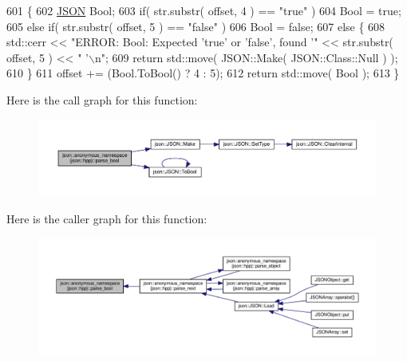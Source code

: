 \begin{DoxyCode}
601                                                          \{
602         \mbox{\hyperlink{class_j_s_o_n}{JSON}} Bool;
603         \textcolor{keywordflow}{if}( str.substr( offset, 4 ) == \textcolor{stringliteral}{"true"} )
604             Bool = \textcolor{keyword}{true};
605         \textcolor{keywordflow}{else} \textcolor{keywordflow}{if}( str.substr( offset, 5 ) == \textcolor{stringliteral}{"false"} )
606             Bool = \textcolor{keyword}{false};
607         \textcolor{keywordflow}{else} \{
608             std::cerr << \textcolor{stringliteral}{"ERROR: Bool: Expected 'true' or 'false', found '"} << str.substr( offset, 5 ) << \textcolor{stringliteral}{"
      '\(\backslash\)n"};
609             \textcolor{keywordflow}{return} std::move( JSON::Make( JSON::Class::Null ) );
610         \}
611         offset += (Bool.ToBool() ? 4 : 5);
612         \textcolor{keywordflow}{return} std::move( Bool );
613     \}
\end{DoxyCode}
Here is the call graph for this function\+:
\nopagebreak
\begin{figure}[H]
\begin{center}
\leavevmode
\includegraphics[width=350pt]{namespacejson_1_1anonymous__namespace_02json_8hpp_03_ae47f0a41d47e83e2ce1f5f267e938c1e_cgraph}
\end{center}
\end{figure}
Here is the caller graph for this function\+:
\nopagebreak
\begin{figure}[H]
\begin{center}
\leavevmode
\includegraphics[width=350pt]{namespacejson_1_1anonymous__namespace_02json_8hpp_03_ae47f0a41d47e83e2ce1f5f267e938c1e_icgraph}
\end{center}
\end{figure}
\mbox{\label{namespacejson_1_1anonymous__namespace_02json_8hpp_03_acd55b945d1583038db8633516df7cf3f}} 
